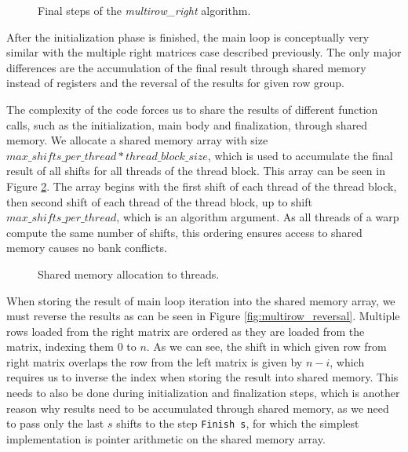 \begin{figure}[ht]
	\centering
	\def\svgwidth{0.5\textwidth}
	
	\caption{Final steps of the \textit{multirow\_right} algorithm.}
	\label{fig:multirow_fini}
\end{figure}

After the initialization phase is finished, the main loop is conceptually very similar with the multiple right matrices case described previously. The only major differences are the accumulation of the final result through shared memory instead of registers and the reversal of the results for given row group.

The complexity of the code forces us to share the results of different function calls, such as the initialization, main body and finalization, through shared memory. We allocate a shared memory array with size $max\_shifts\_per\_thread * thread\_block\_size$, which is used to accumulate the final result of all shifts for all threads of the thread block. This array can be seen in Figure \ref{fig:multirow_sharedmem}. The array begins with the first shift of each thread of the thread block, then second shift of each thread of the thread block, up to shift $max\_shifts\_per\_thread$, which is an algorithm argument. As all threads of a warp compute the same number of shifts, this ordering ensures access to shared memory causes no bank conflicts.

\begin{figure}[ht]
	\centering
	\def\svgwidth{0.5\textwidth}
	
	\caption{Shared memory allocation to threads.}
	\label{fig:multirow_sharedmem}
\end{figure}

When storing the result of main loop iteration into the shared memory array, we must reverse the results as can be seen in Figure \ref{fig:multirow_reversal}. Multiple rows loaded from the right matrix are ordered as they are loaded from the matrix, indexing them $0$ to $n$. As we can see, the shift in which given row from right matrix overlaps the row from the left matrix is given by $n - i$, which requires us to inverse the index when storing the result into shared memory. This needs to also be done during initialization and finalization steps, which is another reason why results need to be accumulated through shared memory, as we need to pass only the last $s$ shifts to the step \texttt{Finish s}, for which the simplest implementation is pointer arithmetic on the shared memory array.

